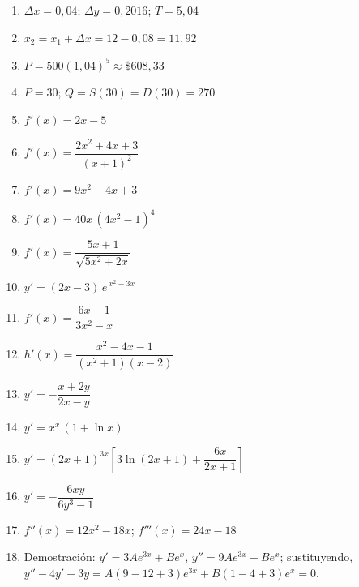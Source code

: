 \documentclass[12pt, letterpaper]{article}
\begin{document}
  \begin{enumerate}[leftmargin=*, label=\textbf{\arabic*.}]

    \item $\Delta x = 0{,}04$; \quad $\Delta y = 0{,}2016$; \quad $T = 5{,}04$

    \item $x_2 = x_1 + \Delta x = 12 - 0{,}08 = 11{,}92$

    \item $P = 500(1{,}04)^{5} \approx \$608{,}33$

    \item $P = 30$; \quad $Q = S(30) = D(30) = 270$

    \item $f'(x) = 2x - 5$

    \item $f'(x) = \dfrac{2x^{2} + 4x + 3}{(x+1)^{2}}$

    \item $f'(x) = 9x^{2} - 4x + 3$

    \item $f'(x) = 40x\,(4x^{2}-1)^{4}$

    \item $f'(x) = \dfrac{5x+1}{\sqrt{5x^{2}+2x}}$

    \item $y' = (2x-3)\,e^{\,x^{2}-3x}$

    \item $f'(x) = \dfrac{6x-1}{3x^{2}-x}$

    \item $h'(x) = \dfrac{x^{2} - 4x - 1}{(x^{2}+1)(x-2)}$

    \item $y' = -\dfrac{x + 2y}{2x - y}$

    \item $y' = x^{x}\,(1 + \ln x)$

    \item $y' = (2x+1)^{3x}\left[3\ln(2x+1) + \dfrac{6x}{2x+1}\right]$

    \item $y' = -\dfrac{6xy}{6y^{3} - 1}$

    \item $f''(x) = 12x^{2} - 18x$; \quad $f'''(x) = 24x - 18$

    \item Demostración: $y' = 3Ae^{3x} + Be^{x}$, \; $y'' = 9Ae^{3x} + Be^{x}$; \; sustituyendo, $y'' - 4y' + 3y = A(9-12+3)e^{3x} + B(1-4+3)e^{x} = 0$.


\end{enumerate}
\end{document}
